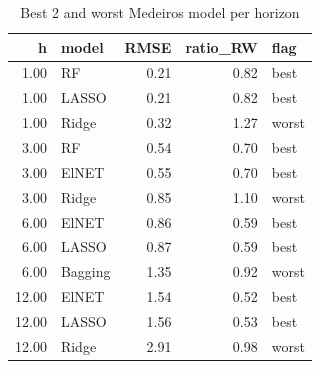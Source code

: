 \begin{table}[ht]
\centering
\begin{tabular}{rlrrl}
  \hline
h & model & RMSE & ratio\_RW & flag \\ 
  \hline
1.00 & RF & 0.21 & 0.82 & best \\ 
  1.00 & LASSO & 0.21 & 0.82 & best \\ 
  1.00 & Ridge & 0.32 & 1.27 & worst \\ 
  3.00 & RF & 0.54 & 0.70 & best \\ 
  3.00 & ElNET & 0.55 & 0.70 & best \\ 
  3.00 & Ridge & 0.85 & 1.10 & worst \\ 
  6.00 & ElNET & 0.86 & 0.59 & best \\ 
  6.00 & LASSO & 0.87 & 0.59 & best \\ 
  6.00 & Bagging & 1.35 & 0.92 & worst \\ 
  12.00 & ElNET & 1.54 & 0.52 & best \\ 
  12.00 & LASSO & 1.56 & 0.53 & best \\ 
  12.00 & Ridge & 2.91 & 0.98 & worst \\ 
   \hline
\end{tabular}
\caption{Best 2 and worst Medeiros model per horizon} 
\label{tab:med_selection}
\end{table}
